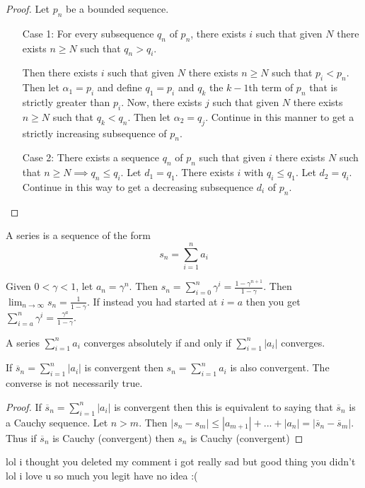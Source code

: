 \documentclass{article}
\newcommand{\ra}[1][]{\xrightarrow{#1}}
\begin{document}
\begin{proof}
    Let $p_n$ be a bounded sequence.
\begin{enumerate}
    \item[Case 1:]  For every subsequence $q_n$ of $p_n$, there exists $i$ such that given $N$ there exists $n\geq N$ such that $q_n>q_i$.

    Then there exists $i$ such that given $N$ there exists $n\geq N$ such that $p_i<p_n$. Then let $\alpha_1=p_i$ and define $q_1=p_i$ and $q_k$ the $k-1$th term of $p_n$ that is strictly greater than $p_i$. Now, there exists $j$ such that given $N$ there exists $n\geq N$ such that $q_k<q_n$. Then let $\alpha_2=q_j$. Continue in this manner to get a strictly increasing subsequence of $p_n$.
    \item[Case 2:] There exists a sequence $q_n$ of $p_n$ such that given $i$ there exists $N$ such that $n\geq N\implies q_n\leq q_i$.
    Let $d_1=q_1$. There exists $i$ with $q_i\leq q_1$. Let $d_2=q_i$. Continue in this way to get a decreasing subsequence $d_i$ of $p_n$.

\end{enumerate}
\end{proof}
\begin{definition}
A series is a sequence of the form $$s_n=\sum_{i=1}^n{a_i}$$
\end{definition}
\begin{definition}
Given $0<\gamma<1$, let $a_n=\gamma^n$. Then $s_n=\sum_{i=0}^n\gamma^i=\frac{1-\gamma^{n+1}}{1-\gamma}$. Then $\lim_{n\ra\infty}s_n=\frac{1}{1-\gamma}$. If instead you had started at $i=a$ then you get $\sum_{i=a}^n\gamma^i=\frac{\gamma^a}{1-\gamma}$.
\end{definition}
\begin{definition}
A series $\sum_{i=1}^n a_i$ converges absolutely if and only if $\sum_{i=1}^n|a_i|$ converges.
\end{definition}
\begin{proposition}
If $\overline{s}_n=\sum_{i=1}^n|a_i|$ is convergent then $s_n=\sum_{i=1}^n a_i$ is also convergent. The converse is not necessarily true.
\end{proposition}
\begin{proof}
If $\overline{s}_n=\sum_{i=1}^n|a_i|$ is convergent then this is equivalent to saying that $\overline{s}_n$ is a Cauchy sequence. Let $n>m$. Then $|s_n-s_m|\leq|a_{m+1}|+...+|a_n|=|\overline{s}_n-\overline{s}_m|$. Thus if $\overline{s}_n$ is Cauchy (convergent) then $s_n$ is Cauchy (convergent)
\end{proof} lol i thought you deleted my comment i got really sad but good thing you didn't lol i love u so much you legit have no idea :(
\end{document}
